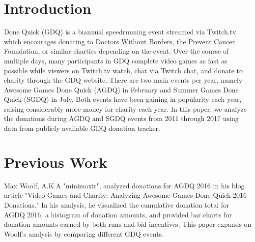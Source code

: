 \documentclass[journal]{IEEEtran}
\begin{document}
\section{Introduction}
% 
% 
% 
% 
 Done Quick (GDQ) is a biannual speedrunning event streamed via Twitch.tv which encourages donating to Doctors Without Borders, the Prevent Cancer Foundation, or similar charties depending on the event. Over the course of multiple days, many participants in GDQ complete video games as fast as possible while viewers on Twitch.tv watch, chat via Twitch chat, and donate to charity through the GDQ website. There are two main events per year, namely Awesome Games Done Quick (AGDQ) in February and Summer Games Done Quick (SGDQ) in July. Both events have been gaining in popularity each year, raising considerably more money for charity each year. In this paper, we analyze the donations during AGDQ and SGDQ events from 2011 through 2017 using data from publicly available GDQ donation tracker.



 

\section{Previous Work}

Max Woolf, A.K.A "minimaxir", analyzed donations for AGDQ 2016 in his blog article "Video Games and Charity: Analyzing Awesome Games Done Quick 2016 Donations\cite{minimaxir}." In his analysis, he visualized the cumulative donation total for AGDQ 2016, a histogram of donation amounts, and provided bar charts for donation amounts earned by both runs and bid incentives. This paper expands on Woolf's analysis by comparing different GDQ events.
\end{document}
